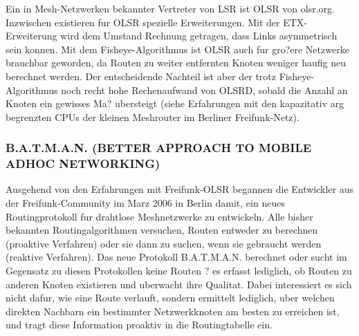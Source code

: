  Ein in Mesh-Netzwerken
bekannter Vertreter von LSR ist OLSR von olsr.org. Inzwischen existieren
fur OLSR spezielle Erweiterungen. Mit der ETX-Erweiterung wird dem
Umstand Rechnung getragen, dass Links asymmetrisch sein konnen. Mit
dem Fisheye-Algorithmus ist OLSR auch fur gro?ere Netzwerke brauchbar
geworden, da Routen zu weiter entfernten Knoten weniger haufig neu
berechnet werden. Der entscheidende Nachteil ist aber der trotz
Fisheye-Algorithmus noch recht hohe Rechenaufwand von OLSRD, sobald
die Anzahl an Knoten ein gewisses Ma? ubersteigt (siehe Erfahrungen mit
den kapazitativ arg begrenzten CPUs der kleinen Meshrouter im Berliner
Freifunk-Netz). 
 


\subsubsection{B.A.T.M.A.N. (BETTER APPROACH TO MOBILE ADHOC NETWORKING)}

Ausgehend von den Erfahrungen mit Freifunk-OLSR begannen die Entwickler
aus der Freifunk-Community im Marz 2006 in Berlin damit, ein neues
Routingprotokoll fur drahtlose Meshnetzwerke zu entwickeln. Alle bisher
bekannten Routingalgorithmen versuchen, Routen entweder zu berechnen
(proaktive Verfahren) oder sie dann zu suchen, wenn sie gebraucht werden
(reaktive Verfahren). Das neue Protokoll B.A.T.M.A.N. berechnet oder
sucht im Gegensatz zu diesen Protokollen keine Routen ? es erfasst
lediglich, ob Routen zu anderen Knoten existieren und uberwacht ihre
Qualitat. Dabei interessiert es sich nicht dafur, wie eine Route verlauft,
sondern ermittelt lediglich, uber welchen direkten Nachbarn ein bestimmter
Netzwerkknoten am besten zu erreichen ist, und tragt diese Information
proaktiv in die Routingtabelle ein. 


